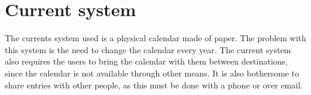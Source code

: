 \section{Current system}
The currents system used is a physical calendar made of paper. The problem with this system is the need to change the calendar every year. The current system also requires the users to bring the calendar with them between destinations, since the calendar is not available through other means. It is also bothersome to share entries with other people, as this must be done with a phone or over email.